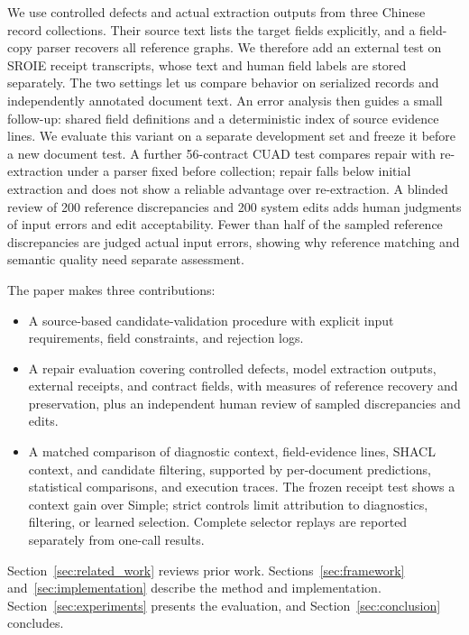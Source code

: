 We use controlled defects and actual extraction outputs from three Chinese
record collections. Their source text lists the target fields explicitly,
and a field-copy parser recovers all reference graphs. We therefore add an
external test on SROIE receipt transcripts, whose text and human field labels
are stored separately. The two settings let us compare behavior on serialized
records and independently annotated document text.
An error analysis then guides a small follow-up: shared field definitions
and a deterministic index of source evidence lines. We evaluate this variant
on a separate development set and freeze it before a new document test.
A further 56-contract CUAD test compares repair with re-extraction under
a parser fixed before collection; repair falls below initial extraction
and does not show a reliable advantage over re-extraction.
A blinded review of 200 reference discrepancies and 200 system edits adds
human judgments of input errors and edit acceptability. Fewer than half of
the sampled reference discrepancies are judged actual input errors, showing
why reference matching and semantic quality need separate assessment.

The paper makes three contributions:
\begin{itemize}
    \item A source-based candidate-validation procedure with explicit input
    requirements, field constraints, and rejection logs.
    \item A repair evaluation covering controlled defects, model extraction
    outputs, external receipts, and contract fields, with measures of reference
    recovery and preservation, plus an independent human review of sampled
    discrepancies and edits.
    \item A matched comparison of diagnostic context, field-evidence lines, SHACL context, and
    candidate filtering, supported by per-document predictions, statistical
    comparisons, and execution traces. The frozen receipt test shows a context gain over Simple; strict controls
    limit attribution to diagnostics, filtering, or learned selection.
    Complete selector replays are reported separately from one-call results.
\end{itemize}

Section~\ref{sec:related_work} reviews prior work.
Sections~\ref{sec:framework} and~\ref{sec:implementation} describe the method
and implementation. Section~\ref{sec:experiments} presents the evaluation,
and Section~\ref{sec:conclusion} concludes.
